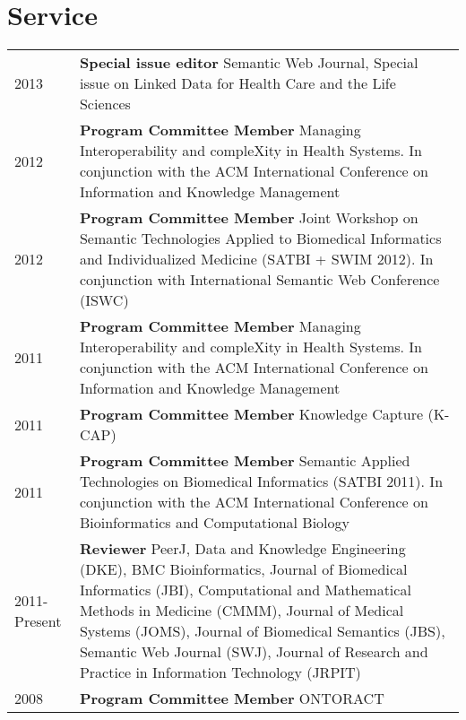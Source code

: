 \documentclass[11pt,fullpage]{article}
\begin{document}
\section*{Service}


\begin{longtable}{p{0.5in}|p{5.5in}}

2013 & {\bf Special issue editor} Semantic Web Journal, Special issue on Linked Data for Health Care and the Life Sciences \\
2012 & \textbf{Program Committee Member} Managing Interoperability and compleXity in Health Systems. In conjunction with the ACM International Conference on Information and Knowledge Management\\
2012 & \textbf{Program Committee Member} Joint Workshop on Semantic Technologies Applied to Biomedical Informatics and Individualized Medicine (SATBI + SWIM 2012). In conjunction with International Semantic Web Conference (ISWC)\\
2011 & \textbf{Program Committee Member} Managing Interoperability and compleXity in Health Systems. In conjunction with the ACM International Conference on Information and Knowledge Management\\
2011 & \textbf{Program Committee Member} Knowledge Capture (K-CAP)\\
2011 & \textbf{Program Committee Member} Semantic Applied Technologies on Biomedical Informatics (SATBI 2011). In conjunction with the ACM International Conference on Bioinformatics and Computational Biology\\
2011-Present  & \textbf{Reviewer} PeerJ, Data and Knowledge Engineering (DKE),
BMC Bioinformatics,
Journal of Biomedical Informatics (JBI),
Computational and Mathematical Methods in Medicine (CMMM),
Journal of Medical Systems (JOMS),
Journal of Biomedical Semantics (JBS),
Semantic Web Journal (SWJ),
Journal of Research and Practice in Information Technology (JRPIT)\\

2008 & \textbf{Program Committee Member} ONTORACT \\

\end{longtable}
\end{document}
